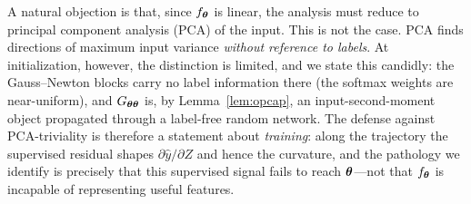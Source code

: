 \begin{remark}
\label{rem:not_pca}
A natural objection is that, since $f_{\boldsymbol{\theta}}$ is linear, the analysis
must reduce to principal component analysis (PCA) of the input. This
is not the case. PCA finds directions of maximum input variance
\emph{without reference to labels}. At initialization, however, the
distinction is limited, and we state this candidly: the
Gauss--Newton blocks carry no label information there (the softmax
weights are near-uniform), and $G_{{\boldsymbol{\theta}}{\boldsymbol{\theta}}}$ is, by
Lemma~\ref{lem:opcap}, an input-second-moment object propagated
through a label-free random network. The defense against
PCA-triviality is therefore a statement about \emph{training}: along
the trajectory the supervised residual shapes
$\partial \hat{y}/\partial Z$ and hence the curvature, and the
pathology we identify is precisely that this supervised signal
fails to reach ${\boldsymbol{\theta}}$---not that $f_{\boldsymbol{\theta}}$ is incapable of
representing useful features.
\end{remark}
